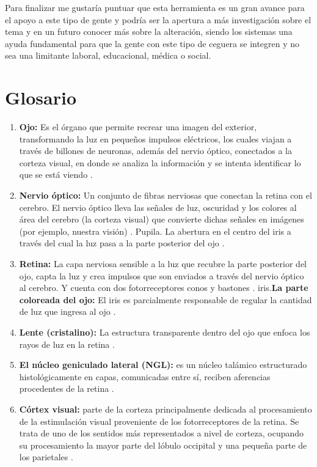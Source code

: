 \documentclass[10pt]{article}
\begin{document}
Para finalizar me gustaría puntuar que esta herramienta es un gran avance para el apoyo a este tipo de gente y podría ser la apertura a más investigación sobre el tema y en un futuro conocer más sobre la alteración, siendo los sistemas una ayuda fundamental para que la gente con este tipo de ceguera se integren y no sea una limitante laboral, educacional, médica o social.
\newpage
\section{Glosario}

\begin{enumerate}
\item \textbf{Ojo:} Es el órgano que permite recrear una imagen del exterior, transformando la luz en pequeños impulsos eléctricos, los cuales viajan a través de billones de neuronas, además del nervio óptico, conectados a la corteza visual, en donde se analiza la información y se intenta identificar lo que se está viendo \cite{IEEEreferencias:Ref34}. 
\item \textbf{Nervio óptico:} Un conjunto de fibras nerviosas que conectan la retina con el cerebro. El nervio óptico lleva las señales de luz, oscuridad y los colores al área del cerebro (la corteza visual) que convierte dichas señales en imágenes (por ejemplo, nuestra visión) \cite{IEEEreferencias:Ref35}.
Pupila. La abertura en el centro del iris a través del cual la luz pasa a la parte posterior del ojo \cite{IEEEreferencias:Ref35}. 
\item \textbf{Retina:} La capa nerviosa sensible a la luz que recubre la parte posterior del ojo, capta la luz y crea impulsos que son enviados a través del nervio óptico al cerebro. Y cuenta con dos fotorreceptores conos y bastones \cite{IEEEreferencias:Ref35}. 
iris.\textbf{La parte coloreada del ojo:} El iris es parcialmente responsable de regular la cantidad de luz que ingresa al ojo \cite{IEEEreferencias:Ref35}. 
\item \textbf{Lente (cristalino):} La estructura transparente dentro del ojo que enfoca los rayos de luz en la retina \cite{IEEEreferencias:Ref35}. 
\item \textbf{El núcleo geniculado lateral (NGL):} es un núcleo talámico estructurado histológicamente en capas, comunicadas entre sí, reciben aferencias procedentes de la retina \cite{IEEEreferencias:Ref36}. 
\item \textbf{Córtex visual:} parte de la corteza principalmente dedicada al procesamiento de la estimulación visual proveniente de los fotorreceptores de la retina. Se trata de uno de los sentidos más representados a nivel de corteza, ocupando su procesamiento la mayor parte del lóbulo occipital y una pequeña parte de los parietales \cite{IEEEreferencias:Ref37}. 

\end{enumerate}
\end{document}
